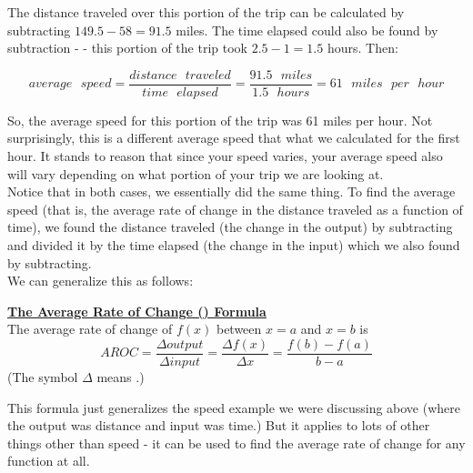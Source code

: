 The distance traveled over this portion of the trip can be calculated by subtracting $149.5 - 58 = 91.5$ miles. The time elapsed could also be found by subtraction - - this portion of the trip took $2.5 - 1 = 1.5$ hours. Then:

\begin{equation*}
	average \text{ } speed = \frac{distance \text{ } traveled}{time \text{ } elapsed} = \frac{91.5 \text{ } miles}{1.5 \text{ } hours} = 61 \text{ } miles \text{ } per \text{ } hour
\end{equation*}

So, the average speed for this portion of the trip was 61 miles per hour. Not surprisingly, this is a different average speed that what we calculated for the first hour. It stands to reason that since your speed varies, your average speed also will vary depending on what portion of your trip we are looking at.\\

Notice that in both cases, we essentially did the same thing. To find the average speed (that is, the average rate of change in the distance traveled as a function of time), we found the distance traveled (the change in the output) by subtracting and divided it by the time elapsed (the change in the input) which we also found by subtracting.\\

We can generalize this as follows:

\begin{definition}
	\textbf{\underline{The Average Rate of Change () Formula}}\\
	\bigskip
	The average rate of change of $f(x)$ between $x=a$ and $x=b$ is
	\begin{equation*}
		AROC=\frac{\Delta output}{\Delta input}=\frac{\Delta f(x)}{\Delta x}=\frac{f(b)-f(a)}{b-a}
	\end{equation*}
	(The symbol $\Delta$ means .)
\end{definition}

This formula just generalizes the speed example we were discussing above (where the output was distance and input was time.) But it applies to lots of other things other than speed - it can be used to find the average rate of change for any function at all.

